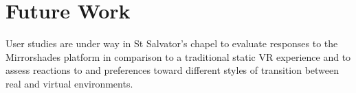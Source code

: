 \documentclass[tog]{acmsiggraph}
\begin{document}
\section{Future Work}
User studies are under way in St Salvator's chapel to evaluate responses to the Mirrorshades platform in comparison to a traditional static VR experience and to assess reactions to and preferences toward different styles of transition between real and virtual environments.





\end{document}
